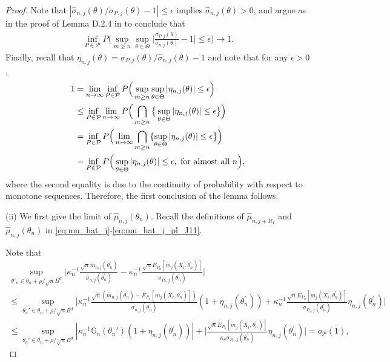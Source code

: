 \documentclass[letterpaper,11pt]{article}
\theoremstyle{myplain}
\theoremstyle{mydefinition}
\theoremstyle{myremark}
\renewcommand{\cite}{\citet}
\numberwithin{equation}{section}
\numberwithin{figure}{section}
\begin{document}
\begin{appendices}
\begin{proof}
Note that $|\hat\sigma_{n,j}(\theta)/\sigma_{P,j}(\theta)-1|\le \epsilon$ implies $\hat\sigma_{n,j}(\theta)>0$, and argue as in the proof of Lemma D.2.4 in \cite{BCS14_misp}  to conclude that
\begin{align}
	\inf_{P\in\mathcal P}P
	\Big(\sup_{m\ge n}\sup_{\theta\in\Theta}\Big|\frac{\sigma_{P,j}(\theta)}{\hat\sigma_{n,j}(\theta)}-1\Big|\le \epsilon\Big)\to 1.\label{eq:ec8}
\end{align}
Finally, recall that $\eta_{n,j}(\theta)=\sigma_{P,j}(\theta)/\hat\sigma_{n,j}(\theta)-1$ and note that for any $\epsilon>0$, 
\begin{align}
1&=\lim_{n\to\infty}\inf_{P\in \mathcal P}P
\Big(\sup_{m\ge n}\sup_{\theta\in\Theta}|\eta_{n,j}(\theta)|\le \epsilon\Big)\notag\\
&\le 	\inf_{P\in \mathcal P}\lim_{n\to\infty}P
\Big(\bigcap_{m\ge n}\big\{\sup_{\theta\in\Theta}|\eta_{n,j}(\theta)|\le \epsilon\big\}\Big)\notag\\
&=\inf_{P\in \mathcal P}P
\Big(\lim_{n\to\infty}\bigcap_{m\ge n}\{\sup_{\theta\in\Theta}|\eta_{n,j}(\theta)|\le \epsilon\big\}\Big)\notag\\
&=\inf_{P\in\mathcal P}P
\Big(\sup_{\theta\in\Theta}|\eta_{n,j}(\theta)|\le \epsilon, \text{ for almost all } n\Big),\label{eq:ec9}
\end{align}
where the second equality is due to the continuity of probability with respect to monotone sequences.
 Therefore, the first conclusion of the lemma follows.
 
 \vspace{0.1in}
 \noindent


 (ii) We first give the limit of $\hat \mu_{n,j}(\theta_n)$. 
 Recall the definitions of $\hat\mu_{n,j+R_1}$ and $\hat\mu_{n,j}(\theta_n )$ in \eqref{eq:mu_hat_j}-\eqref{eq:mu_hat_j_pl_J11}.






Note that 
\begin{multline}
\sup_{\theta'_n\in\theta_n+\rho /\sqrt nB^d}\Big|\kappa_n^{-1}\frac{\sqrt n \bar{m}_{n,j}(\theta_n^\prime)}{\hat{\sigma}_{n,j}(\theta_n^\prime)}-\kappa_n^{-1}\frac{\sqrt nE_{P_n}[m_j(X_i,\theta_n^\prime)]}{\sigma_{P_n,j}(\theta_n^\prime)}\Big|\\
\le \sup_{\theta_n'\in\theta_n+\rho /\sqrt nB^d} \Big|\kappa_n^{-1}\frac{\sqrt n (\bar{m}_{n,j}(\theta_n^\prime) - E_{P_n}[m_j(X_i,\theta_n^\prime)])}{\sigma_{n,j}(\theta_n^\prime)} (1+\eta_{n,j}(\theta_n^\prime))
+\kappa_n^{-1}\frac{\sqrt nE_{P_n}[m_j(X_i,\theta_n^\prime)]}{\sigma_{P_n,j}(\theta_n^\prime)}\eta_{n,j}(\theta_n^\prime) \Big|\\
\le \sup_{\theta_n'\in\theta_n+\rho /\sqrt nB^d}|\kappa_n^{-1}\mathbb G_n(\theta_n')(1+\eta_{n,j}(\theta_n^\prime))| + \Big| \frac{\sqrt nE_{P_n}[m_j(X_i,\theta_n^\prime)]}{\kappa_n\sigma_{P_n,j}(\theta_n^\prime)}\eta_{n,j}(\theta_n^\prime) \Big| =o_{\mathcal P}(1) ,
\end{multline}





\end{proof}
\end{appendices}
\end{document}
